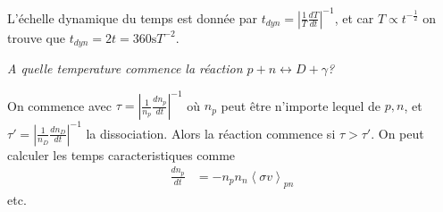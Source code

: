 \documentclass[10pt]{report}
\newcommand{\rd}[2]{\frac{d#1}{d#2}}
\newcommand{\abs}[1]{\left|#1\right|}
\newcommand{\expvalue}[1]{\left<#1\right>}
\begin{document}
L'\'echelle dynamique du temps est donn\'ee par $t_{dyn} = \abs{\frac{1}{T}\rd{T}{t}}^{-1}$, et car $T \propto t^{-\frac{1}{2}}$ on trouve que $t_{dyn} = 2t = 360 \mathrm{s} T^{-2}$. 




\emph{A quelle temperature commence la r\'eaction $p + n \leftrightarrow D + \gamma$?}

On commence avec $\tau = \abs{\frac{1}{n_p}\rd{n_p}{t}}^{-1}$ o\`u $n_p$ peut \^etre n'importe lequel de $p,n$, et $\tau' = \abs{\frac{1}{n_D}\rd{n_D}{t}}^{-1}$ la dissociation. Alors la r\'eaction commence si $\tau > \tau'$. On peut calculer les temps caracteristiques comme
\begin{align}
    \rd{n_p}{t} &= -n_pn_n \expvalue{\sigma v}_{pn}
\end{align}
etc.
\end{document}
